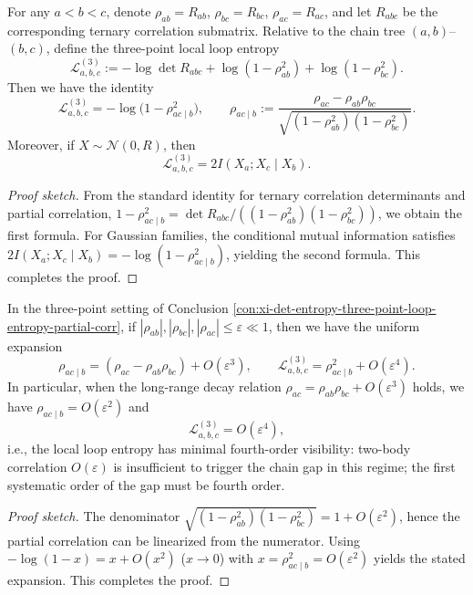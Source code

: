 \begin{conclusion}\label{con:xi-det-entropy-three-point-loop-entropy-partial-corr}
For any \(a<b<c\), denote \(\rho_{ab}=R_{ab}\), \(\rho_{bc}=R_{bc}\), \(\rho_{ac}=R_{ac}\), and let \(R_{abc}\) be the corresponding ternary correlation submatrix.
Relative to the chain tree \((a,b)\)--\((b,c)\), define the three-point local loop entropy
\[
\mathcal L^{(3)}_{a,b,c}
:=-\log\det R_{abc}+\log(1-\rho_{ab}^2)+\log(1-\rho_{bc}^2).
\]
Then we have the identity
\[
\mathcal L^{(3)}_{a,b,c}
=-\log\bigl(1-\rho_{ac\mid b}^2\bigr),
\qquad
\rho_{ac\mid b}:=\frac{\rho_{ac}-\rho_{ab}\rho_{bc}}{\sqrt{(1-\rho_{ab}^2)(1-\rho_{bc}^2)}}.
\]
Moreover, if \(X\sim\mathcal N(0,R)\), then
\[
\mathcal L^{(3)}_{a,b,c}=2I(X_a;X_c\mid X_b).
\]
\end{conclusion}
\begin{proof}[Proof sketch]
From the standard identity for ternary correlation determinants and partial correlation,
\(
1-\rho_{ac\mid b}^2=\det R_{abc}/((1-\rho_{ab}^2)(1-\rho_{bc}^2))
\),
we obtain the first formula.
For Gaussian families, the conditional mutual information satisfies
\(
2I(X_a;X_c\mid X_b)=-\log(1-\rho_{ac\mid b}^2)
\),
yielding the second formula. This completes the proof.
\end{proof}

\begin{conclusion}\label{con:xi-det-entropy-q4-trigger-weak-coherence}
In the three-point setting of Conclusion \ref{con:xi-det-entropy-three-point-loop-entropy-partial-corr}, if
\(
|\rho_{ab}|,|\rho_{bc}|,|\rho_{ac}|\le\varepsilon\ll1
\),
then we have the uniform expansion
\[
\rho_{ac\mid b}=(\rho_{ac}-\rho_{ab}\rho_{bc})+O(\varepsilon^3),
\qquad
\mathcal L^{(3)}_{a,b,c}=\rho_{ac\mid b}^2+O(\varepsilon^4).
\]
In particular, when the long-range decay relation \(\rho_{ac}=\rho_{ab}\rho_{bc}+O(\varepsilon^3)\) holds, we have \(\rho_{ac\mid b}=O(\varepsilon^2)\) and
\[
\mathcal L^{(3)}_{a,b,c}=O(\varepsilon^4),
\]
i.e., the local loop entropy has minimal fourth-order visibility: two-body correlation \(O(\varepsilon)\) is insufficient to trigger the chain gap in this regime; the first systematic order of the gap must be fourth order.
\end{conclusion}
\begin{proof}[Proof sketch]
The denominator \(\sqrt{(1-\rho_{ab}^2)(1-\rho_{bc}^2)}=1+O(\varepsilon^2)\), hence the partial correlation can be linearized from the numerator.
Using \(-\log(1-x)=x+O(x^2)\) (\(x\to0\)) with \(x=\rho_{ac\mid b}^2=O(\varepsilon^2)\) yields the stated expansion. This completes the proof.
\end{proof}

